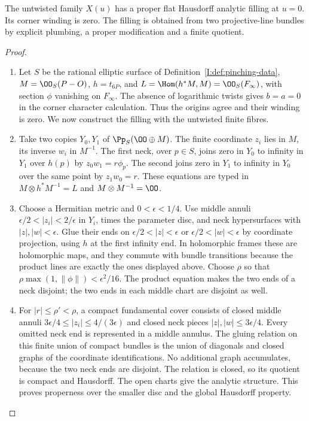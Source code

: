 \begin{theorem}\hypertarget{tag-02RA}{}\label{night:P2.10}\label{stmt:P2.10}

The untwisted family $X(u)$ has a proper flat Hausdorff analytic filling at $u=0$. Its corner winding is zero. The filling is obtained from two projective-line bundles by explicit plumbing, a proper modification and a finite quotient.
\end{theorem}
\begin{proof}
\begin{enumerate}[label=\arabic*.,leftmargin=*]
\item Let $S$ be the rational elliptic surface of Definition~\ref{I:def:pinching-data}, $M=\OO_S(P-O)$, $h=t_{6P}$, and $L=\Hom(h^*M,M)=\OO_S(F_\infty)$, with section $\phi$ vanishing on $F_\infty$. The absence of logarithmic twists gives $b=a=0$ in the corner character calculation. Thus the origins agree and their winding is zero. We now construct the filling with the untwisted finite fibres.

\item Take two copies $Y_0,Y_1$ of $\Pp_S(\OO\oplus M)$. The finite coordinate $z_i$ lies in $M$, its inverse $w_i$ in $M^{-1}$. The first neck, over $p\in S$, joins zero in $Y_0$ to infinity in $Y_1$ over $h(p)$ by $z_0w_1=r\phi_p$. The second joins zero in $Y_1$ to infinity in $Y_0$ over the same point by $z_1w_0=r$. These equations are typed in $M\otimes h^*M^{-1}=L$ and $M\otimes M^{-1}=\OO$.

\item Choose a Hermitian metric and $0<\epsilon<1/4$. Use middle annuli $\epsilon/2<|z_i|<2/\epsilon$ in $Y_i$, times the parameter disc, and neck hypersurfaces with $|z|,|w|<\epsilon$. Glue their ends on $\epsilon/2<|z|<\epsilon$ or $\epsilon/2<|w|<\epsilon$ by coordinate projection, using $h$ at the first infinity end. In holomorphic frames these are holomorphic maps, and they commute with bundle transitions because the product lines are exactly the ones displayed above. Choose $\rho$ so that $\rho\max(1,\|\phi\|)<\epsilon^2/16$. The product equation makes the two ends of a neck disjoint; the two ends in each middle chart are disjoint as well.

\item For $|r|\le\rho'<\rho$, a compact fundamental cover consists of closed middle annuli $3\epsilon/4\le|z_i|\le4/(3\epsilon)$ and closed neck pieces $|z|,|w|\le3\epsilon/4$. Every omitted neck end is represented in a middle annulus. The gluing relation on this finite union of compact bundles is the union of diagonals and closed graphs of the coordinate identifications. No additional graph accumulates, because the two neck ends are disjoint. The relation is closed, so its quotient is compact and Hausdorff. The open charts give the analytic structure. This proves properness over the smaller disc and the global Hausdorff property.


\end{enumerate}
\end{proof}
